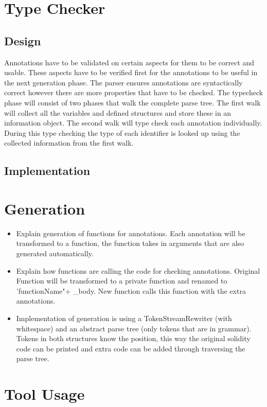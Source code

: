 \documentclass[a4paper]{article}
\begin{document}
\section{Type Checker}
\label{sec:typechecker}
\subsection{Design}
Annotations have to be validated on certain aspects for them to be correct and usable. These aspects have to be verified first for the annotations to be useful in the next generation phase. The parser ensures annotations are syntactically correct however there are more properties that have to be checked. The typecheck phase will consist of two phases that walk the complete parse tree. The first walk will collect all the variables and defined structures and store these in an information object. The second walk will type check each annotation individually. During this type checking the type of each identifier is looked up using the collected information from the first walk. 
\subsection{Implementation}


\section{Generation}
\label{sec:generation}
\begin{itemize}
    \item Explain generation of functions for annotations. Each annotation will be transformed to a function, the function takes in arguments that are also generated automatically.
    \item Explain how functions are calling the code for checking annotations. Original Function will be transformed to a private function and renamed to 'functionName"+ \_body. New function calls this function with the extra annotations.
    \item Implementation of generation is using a TokenStreamRewriter (with whitespace) and an abstract parse tree (only tokens that are in grammar). Tokens in both structures know the position, this way the original solidity code can be printed and extra code can be added through traversing the parse tree.
\end{itemize}

\section{Tool Usage}
\end{document}
